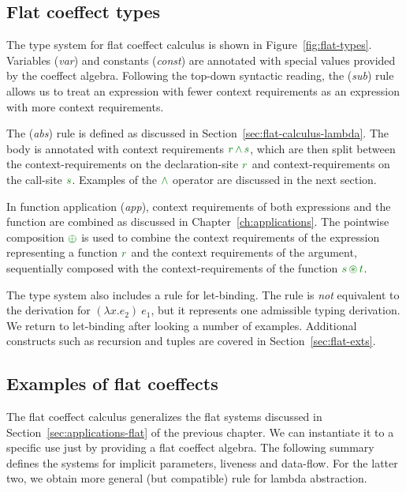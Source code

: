 
\subsection{Flat coeffect types}
The type system for flat coeffect calculus is shown in Figure~\ref{fig:flat-types}. Variables 
(\emph{var}) and constants (\emph{const}) are annotated with special values provided by the 
coeffect algebra. Following the top-down syntactic reading, the (\emph{sub}) rule allows us to 
treat an expression with fewer context requirements as an expression with more context requirements. 

The (\emph{abs}) rule is defined as discussed in Section~\ref{sec:flat-calculus-lambda}. The
body is annotated with context requirements $\cclrd{r} \,\czip\, \cclrd{s}$, which are then split
between the context-requirements on the declaration-site $\cclrd{r}$ and context-requirements on
the call-site $\cclrd{s}$. Examples of the $\czip$ operator are discussed in the next section.

In function application (\emph{app}), context requirements of both expressions and the 
function are combined as discussed in Chapter~\ref{ch:applications}. The pointwise composition
$\cpar$ is used to combine the context requirements of the expression representing a function 
$\cclrd{r}$ and the context requirements of the argument, sequentially composed with the 
context-requirements of the function $\cclrd{s}\, \cseq \,\cclrd{t}$.

The type system also includes a rule for let-binding. The rule is \emph{not} equivalent to the
derivation for $(\lambda x.e_2)~e_1$, but it represents one admissible typing derivation. We
return to let-binding after looking a number of examples. Additional constructs such 
as recursion and tuples are covered in Section~\ref{sec:flat-exts}.


\subsection{Examples of flat coeffects}

The flat coeffect calculus generalizes the flat systems discussed in 
Section~\ref{sec:applications-flat} of the previous chapter. We can instantiate it to a specific
use just by providing a flat coeffect algebra. The following summary defines the systems for implicit 
parameters, liveness and data-flow. For the latter two, we obtain more general (but compatible) rule 
for lambda abstraction.

